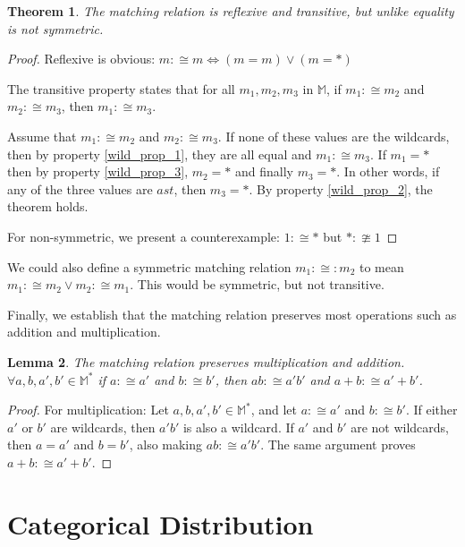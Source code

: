 \documentclass[twoside]{article}
\theoremstyle{plain}%
\newtheorem{theorem}{Theorem}[section]
\newtheorem{lemma}[theorem]{Lemma}
\theoremstyle{definition}
\theoremstyle{remark}
\begin{document}
\begin{theorem}
The matching relation is reflexive and transitive, but unlike equality is not symmetric.
\end{theorem}

\begin{proof}
Reflexive is obvious: \(m :\cong m \Longleftrightarrow (m = m) \vee (m = \ast)\)

The transitive property states that for all \(m_1, m_2, m_3\) in \(\mathbb{M}\), if \(m_1 :\cong m_2\) and \(m_2 :\cong m_3\), then \(m_1 :\cong m_3\).

Assume that \(m_1 :\cong m_2\) and \(m_2 :\cong m_3\). If none of these values are the wildcards, then by property \ref{wild_prop_1}, they are all equal and \(m_1 :\cong m_3\). If \(m_1 = \ast\) then by property \ref{wild_prop_3}, \(m_2 = \ast\) and finally \(m_3 = \ast\). In other words, if any of the three values are \(ast\), then \(m_3 = \ast\). By property \ref{wild_prop_2}, the theorem holds.

For non-symmetric, we present a counterexample: \(1 :\cong \ast\) but \(\ast :\ncong 1\)
\end{proof}

We could also define a symmetric matching relation \(m_1 :\cong: m_2\) to mean \(m_1 :\cong m_2 \vee m_2 :\cong m_1\). This would be symmetric, but not transitive.

Finally, we establish that the matching relation preserves most operations such as addition and multiplication.

\begin{lemma}
\label{lemma:matching_multiplication}
The matching relation preserves multiplication and addition. \(\forall a,b,a',b' \in \mathbb{M^*}\) if \(a :\cong a'\) and \(b :\cong b'\), then \(ab :\cong a'b'\) and \(a+b :\cong a'+b'\).
\end{lemma}

\begin{proof}
For multiplication: Let \(a,b,a',b' \in \mathbb{M^*}\), and let \(a :\cong a'\) and \(b :\cong b'\). If either \(a'\) or \(b'\) are wildcards, then \(a'b'\) is also a wildcard. If \(a'\) and \(b'\) are not wildcards, then \(a = a'\) and \(b = b'\), also making \(ab :\cong a'b'\).
The same argument proves \(a+b :\cong a'+b'\).
\end{proof}

\section{Categorical Distribution}
\end{document}
